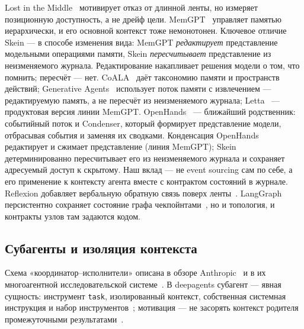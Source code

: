 \documentclass[11pt,a4paper]{article}
\begin{document}
Lost in the Middle~\cite{liu2023lost} мотивирует отказ от длинной ленты, но измеряет
позиционную доступность, а не дрейф цели. MemGPT~\cite{packer2023memgpt} управляет памятью
иерархически, и его основной контекст тоже немонотонен. Ключевое отличие Skein --- в
способе изменения вида: MemGPT \emph{редактирует} представление модельными операциями
памяти, Skein \emph{пересчитывает} представление из неизменяемого журнала. Редактирование
накапливает решения модели о том, что помнить; пересчёт --- нет. CoALA~\cite{sumers2024coala} даёт таксономию памяти и пространств действий; Generative
Agents~\cite{park2023generative} использует поток памяти с извлечением --- редактируемую
память, а не пересчёт из неизменяемого журнала; Letta~\cite{letta} --- продуктовая версия
линии MemGPT. OpenHands~\cite{openhands2024,openhandsSdk2025} --- ближайший родственник:
событийный поток и Condenser, который формирует представление модели, отбрасывая события и
заменяя их сводками. Конденсация OpenHands редактирует и сжимает представление (линия
MemGPT); Skein детерминированно пересчитывает его из неизменяемого журнала и сохраняет
адресуемый доступ к скрытому. Наш вклад --- не event sourcing сам по себе, а его применение
к контексту агента вместе с контрактом состояний в журнале. Reflexion добавляет вербальную обратную
связь поверх ленты~\cite{shinn2023reflexion}. LangGraph
персистентно сохраняет состояние графа чекпойнтами~\cite{langgraphPersistence}, но и
топология, и контракты узлов там задаются кодом.

\subsection{Субагенты и изоляция контекста}

Схема «координатор--исполнители» описана в обзоре Anthropic~\cite{anthropic2024building} и
в их многоагентной исследовательской системе~\cite{anthropic2025multiagent}. В deepagents
субагент --- явная сущность: инструмент \texttt{task}, изолированный контекст, собственная
системная инструкция и набор инструментов~\cite{langchain2025deepagents}; мотивация ---
не засорять контекст родителя промежуточными результатами~\cite{dbreunig2025context}.
\end{document}
